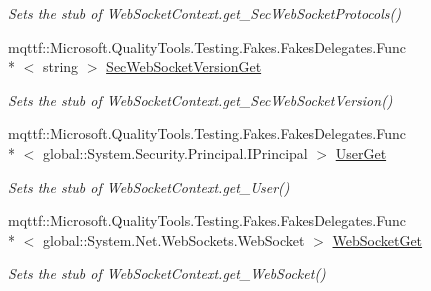 \begin{DoxyCompactItemize}
\begin{DoxyCompactList}\small\item\em Sets the stub of Web\-Socket\-Context.\-get\-\_\-\-Sec\-Web\-Socket\-Protocols()\end{DoxyCompactList}\item 
mqttf\-::\-Microsoft.\-Quality\-Tools.\-Testing.\-Fakes.\-Fakes\-Delegates.\-Func\\*
$<$ string $>$ \hyperlink{class_system_1_1_net_1_1_web_sockets_1_1_fakes_1_1_stub_web_socket_context_a0c3d704d8bd974fb304f3792937b661a}{Sec\-Web\-Socket\-Version\-Get}
\begin{DoxyCompactList}\small\item\em Sets the stub of Web\-Socket\-Context.\-get\-\_\-\-Sec\-Web\-Socket\-Version()\end{DoxyCompactList}\item 
mqttf\-::\-Microsoft.\-Quality\-Tools.\-Testing.\-Fakes.\-Fakes\-Delegates.\-Func\\*
$<$ global\-::\-System.\-Security.\-Principal.\-I\-Principal $>$ \hyperlink{class_system_1_1_net_1_1_web_sockets_1_1_fakes_1_1_stub_web_socket_context_a7b3a37ebd24c9dacbe207af51630b3f6}{User\-Get}
\begin{DoxyCompactList}\small\item\em Sets the stub of Web\-Socket\-Context.\-get\-\_\-\-User()\end{DoxyCompactList}\item 
mqttf\-::\-Microsoft.\-Quality\-Tools.\-Testing.\-Fakes.\-Fakes\-Delegates.\-Func\\*
$<$ global\-::\-System.\-Net.\-Web\-Sockets.\-Web\-Socket $>$ \hyperlink{class_system_1_1_net_1_1_web_sockets_1_1_fakes_1_1_stub_web_socket_context_a240591e085b213e062358cd486e93a1c}{Web\-Socket\-Get}
\begin{DoxyCompactList}\small\item\em Sets the stub of Web\-Socket\-Context.\-get\-\_\-\-Web\-Socket()\end{DoxyCompactList}\end{DoxyCompactItemize}
